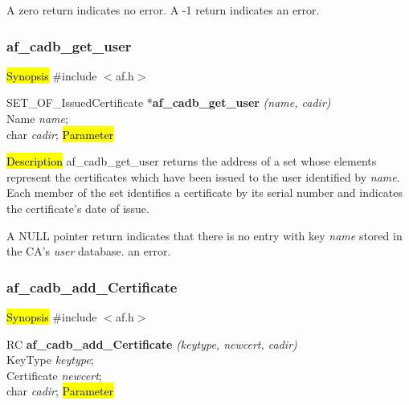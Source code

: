 A  zero return indicates no error.
A -1 return indicates an error.



\subsubsection{af\_cadb\_get\_user}
\label{af_cadb_get_user}
\hl{Synopsis}
\#include $<$af.h$>$

SET\_OF\_IssuedCertificate *{\bf af\_cadb\_get\_user} {\em (name, cadir)} \\
Name {\em *name}; \\
char {\em *cadir};
\hl{Parameter}


\hl{Description}
af\_cadb\_get\_user returns the address of a set whose elements represent the certificates 
which have been issued to the user identified by {\em name}. Each member of the set identifies
a certificate by its serial number and indicates the certificate's date of issue.

A NULL pointer return indicates
\bi
\m that there is no entry with key {\em name} stored in the CA's {\em user} database.
\m an error.
\ei



\subsubsection{af\_cadb\_add\_Certificate}
\label{af_cadb_add_Certificate}
\hl{Synopsis}
\#include $<$af.h$>$

RC {\bf af\_cadb\_add\_Certificate} {\em (keytype, newcert, cadir)} \\
KeyType     {\em keytype}; \\
Certificate {\em *newcert}; \\
char	    {\em *cadir};
\hl{Parameter}

